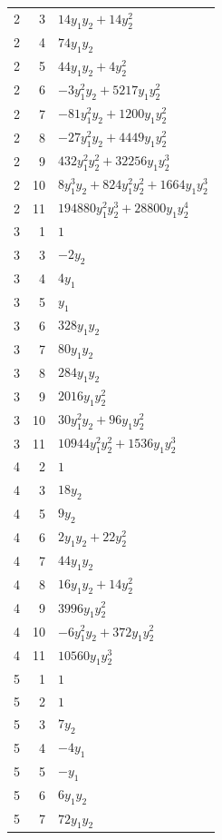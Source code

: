 \documentclass[10pt,a4paper]{article}
\begin{document}
{\begin{longtable}{rrp{125mm}}
2 & 3 & $14 y_{1} y_{2} + 14 y_{2}^{2}$\\
2 & 4 & $74 y_{1} y_{2}$\\
2 & 5 & $44 y_{1} y_{2} + 4 y_{2}^{2}$\\
2 & 6 & $- 3 y_{1}^{2} y_{2} + 5217 y_{1} y_{2}^{2}$\\
2 & 7 & $- 81 y_{1}^{2} y_{2} + 1200 y_{1} y_{2}^{2}$\\
2 & 8 & $- 27 y_{1}^{2} y_{2} + 4449 y_{1} y_{2}^{2}$\\
2 & 9 & $432 y_{1}^{2} y_{2}^{2} + 32256 y_{1} y_{2}^{3}$\\
2 & 10 & $8 y_{1}^{3} y_{2} + 824 y_{1}^{2} y_{2}^{2} + 1664 y_{1} y_{2}^{3}$\\
2 & 11 & $194880 y_{1}^{2} y_{2}^{3} + 28800 y_{1} y_{2}^{4}$\\
3 & 1 & $1$\\
3 & 3 & $- 2 y_{2}$\\
3 & 4 & $4 y_{1}$\\
3 & 5 & $y_{1}$\\
3 & 6 & $328 y_{1} y_{2}$\\
3 & 7 & $80 y_{1} y_{2}$\\
3 & 8 & $284 y_{1} y_{2}$\\
3 & 9 & $2016 y_{1} y_{2}^{2}$\\
3 & 10 & $30 y_{1}^{2} y_{2} + 96 y_{1} y_{2}^{2}$\\
3 & 11 & $10944 y_{1}^{2} y_{2}^{2} + 1536 y_{1} y_{2}^{3}$\\
4 & 2 & $1$\\
4 & 3 & $18 y_{2}$\\
4 & 5 & $9 y_{2}$\\
4 & 6 & $2 y_{1} y_{2} + 22 y_{2}^{2}$\\
4 & 7 & $44 y_{1} y_{2}$\\
4 & 8 & $16 y_{1} y_{2} + 14 y_{2}^{2}$\\
4 & 9 & $3996 y_{1} y_{2}^{2}$\\
4 & 10 & $- 6 y_{1}^{2} y_{2} + 372 y_{1} y_{2}^{2}$\\
4 & 11 & $10560 y_{1} y_{2}^{3}$\\
5 & 1 & $1$\\
5 & 2 & $1$\\
5 & 3 & $7 y_{2}$\\
5 & 4 & $- 4 y_{1}$\\
5 & 5 & $- y_{1}$\\
5 & 6 & $6 y_{1} y_{2}$\\
5 & 7 & $72 y_{1} y_{2}$\\

\end{longtable}}
\end{document}

